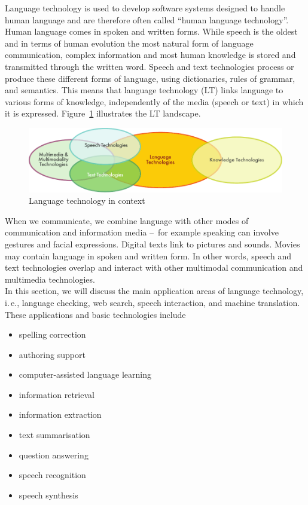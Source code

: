\documentclass[]{../../metanetpaper}
\begin{document}
\begin{multicols}{2}

Language technology is used to develop software systems designed to handle human language and are therefore often called “human language technology”. Human language comes in spoken and written forms. While speech is the oldest and in terms of human evolution the most natural form of language communication, complex information and most human knowledge is stored and transmitted through the written word. Speech and text technologies process or produce these different forms of language, using dictionaries, rules of grammar, and semantics. This means that language technology (LT) links language to various forms of knowledge, independently of the media (speech or text) in which it is expressed. Figure~\ref{fig:ltincontext_en} illustrates the LT landscape.

\begin{figure}[htb]
  \center
  \includegraphics[width=\textwidth]{../_media/english/language_technologies}
  \caption{Language technology in context}
  \label{fig:ltincontext_en}
\end{figure}

When we communicate, we combine language with other modes of communication and information media --~for example speaking can involve gestures and facial expressions. Digital texts link to pictures and sounds. Movies may contain language in spoken and written form. In other words, speech and text technologies overlap and interact with other multimodal communication and multimedia technologies.\\ 
In this section, we will discuss the main application areas of language technology, i.\,e., language checking, web search, speech interaction, and machine translation. These applications and basic technologies include 

\begin{itemize}
\item spelling correction
\item authoring support
\item computer-assisted language learning
\item information retrieval 
\item information extraction
\item text summarisation
\item question answering
\item speech recognition 
\item speech synthesis 
\end{itemize}



\end{multicols}
\end{document}
